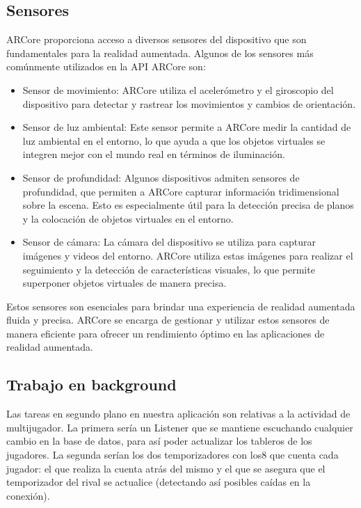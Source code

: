\documentclass[a4paper, openright, 12pt]{article}
\begin{document}
\subsection{Sensores}
ARCore proporciona acceso a diversos sensores del dispositivo que son fundamentales para la realidad aumentada. Algunos de los sensores más comúnmente utilizados en la API ARCore son:

\begin{itemize}
  \item Sensor de movimiento: ARCore utiliza el acelerómetro y el giroscopio del dispositivo para detectar y rastrear los movimientos y cambios de orientación.
  
  \item Sensor de luz ambiental: Este sensor permite a ARCore medir la cantidad de luz ambiental en el entorno, lo que ayuda a que los objetos virtuales se integren mejor con el mundo real en términos de iluminación.
  
  \item Sensor de profundidad: Algunos dispositivos admiten sensores de profundidad, que permiten a ARCore capturar información tridimensional sobre la escena. Esto es especialmente útil para la detección precisa de planos y la colocación de objetos virtuales en el entorno.
  
  \item Sensor de cámara: La cámara del dispositivo se utiliza para capturar imágenes y videos del entorno. ARCore utiliza estas imágenes para realizar el seguimiento y la detección de características visuales, lo que permite superponer objetos virtuales de manera precisa.
\end{itemize}

Estos sensores son esenciales para brindar una experiencia de realidad aumentada fluida y precisa. ARCore se encarga de gestionar y utilizar estos sensores de manera eficiente para ofrecer un rendimiento óptimo en las aplicaciones de realidad aumentada.

\subsection{Trabajo en background}
Las tareas en segundo plano en nuestra aplicación son relativas a la actividad de multijugador. La primera sería un Listener que se mantiene escuchando cualquier cambio en la base de datos, para así poder actualizar los tableros de los jugadores. La segunda serían los dos temporizadores con los8 que cuenta cada jugador: el que realiza la cuenta atrás del mismo y el que se asegura que el temporizador del rival se actualice (detectando así posibles caídas en la conexión).
\end{document}
